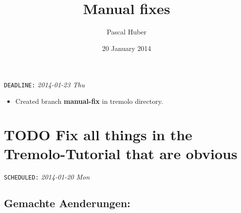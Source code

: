 \documentclass[11pt]{article}
\title{Manual fixes}
\author{Pascal Huber}
\date{20 January 2014}
\begin{document}
\maketitle

\setcounter{tocdepth}{3}
\tableofcontents
\vspace*{1cm}
   \texttt{DEADLINE:} \textit{2014-01-23 Thu}\newline

\begin{itemize}
\item Created branch \textbf{manual-fix} in tremolo directory.
\end{itemize}
\section{\textbf{TODO} Fix all things in the Tremolo-Tutorial that are obvious}
\label{sec-1}

     \texttt{SCHEDULED:} \textit{2014-01-20 Mon}\newline

\subsection{Gemachte Aenderungen:}
\label{sec-1.1}
\end{document}
